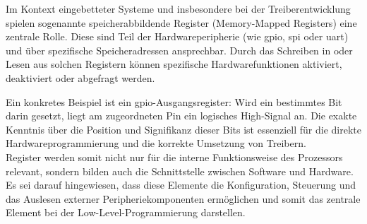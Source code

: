 Im Kontext eingebetteter Systeme und insbesondere bei der Treiberentwicklung spielen sogenannte speicherabbildende Register (Memory-Mapped Registers) eine zentrale Rolle. 
Diese sind Teil der Hardwareperipherie (wie \gls{gpio}, \gls{spi} oder \gls{uart}) und über spezifische Speicheradressen ansprechbar. 
Durch das Schreiben in oder Lesen aus solchen Registern können spezifische Hardwarefunktionen aktiviert, deaktiviert oder abgefragt werden.

Ein konkretes Beispiel ist ein \gls{gpio}-Ausgangsregister: Wird ein bestimmtes Bit darin gesetzt, liegt am zugeordneten Pin ein logisches High-Signal an. 
Die exakte Kenntnis über die Position und Signifikanz dieser Bits ist essenziell für die direkte Hardwareprogrammierung und die korrekte Umsetzung von Treibern.
\\
Register werden somit nicht nur für die interne Funktionsweise des Prozessors relevant, sondern bilden auch die Schnittstelle zwischen Software und Hardware. Es sei darauf hingewiesen, dass diese Elemente die Konfiguration, Steuerung und das Auslesen externer Peripheriekomponenten ermöglichen und somit das zentrale Element bei der Low-Level-Programmierung darstellen.

